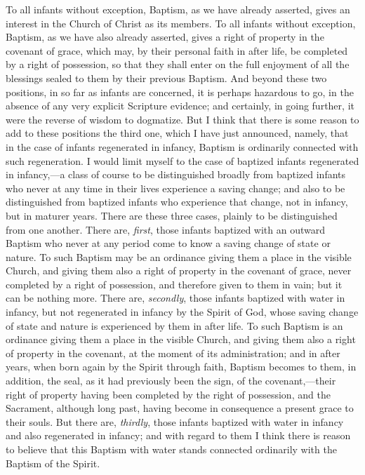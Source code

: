 \documentclass[english,]{book}
\begin{document}
To all infants without exception, Baptism, as we have already asserted, gives an interest in the Church of Christ as its members. To all infants without exception, Baptism, as we have also already asserted, gives a right of property in the covenant of grace, which may, by their personal faith in after life, be completed by a right of possession, so that they shall enter on the full enjoyment of all the blessings sealed to them by their previous Baptism. And beyond these two positions, in so far as infants are concerned, it is perhaps hazardous to go, in the absence of any very explicit Scripture evidence; and certainly, in going further, it were the reverse of wisdom to dogmatize. But I think that there is some reason to add to these positions the third one, which I have just announced, namely, that in the case of infants regenerated in infancy, Baptism is ordinarily connected with such regeneration. I would limit myself to the case of baptized infants regenerated in infancy,---a class of course to be distinguished broadly from baptized infants who never at any time in their lives experience a saving change; and also to be distinguished from baptized infants who experience that change, not in infancy, but in maturer years. There are these three cases, plainly to be distinguished from one another. There are, \emph{first}, those infants baptized with an outward Baptism who never at any period come to know a saving change of state or nature. To such Baptism may be an ordinance giving them a place in the visible Church, and giving them also a right of property in the covenant of grace, never completed by a right of possession, and therefore given to them in vain; but it can be nothing more. There are, \emph{secondly}, those infants baptized with water in infancy, but not regenerated in infancy by the Spirit of God, whose saving change of state and nature is experienced by them in after life. To such Baptism is an ordinance giving them a place in the visible Church, and giving them also a right of property in the covenant, at the moment of its administration; and in after years, when born again by the Spirit through faith, Baptism becomes to them, in addition, the seal, as it had previously been the sign, of the covenant,---their right of property having been completed by the right of possession, and the Sacrament, although long past, having become in consequence a present grace to their souls. But there are, \emph{thirdly}, those infants baptized with water in infancy and also regenerated in infancy; and with regard to them I think there is reason to believe that this Baptism with water stands connected ordinarily with the Baptism of the Spirit.
\end{document}
